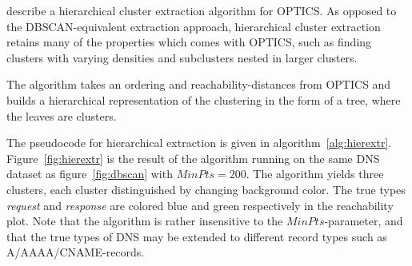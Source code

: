 \documentclass[a4paper]{report}
\begin{document}
\citet{sander03} describe a hierarchical cluster extraction algorithm for
OPTICS. As opposed to the DBSCAN-equivalent extraction approach, hierarchical
cluster extraction retains many of the properties which comes with OPTICS,
such as finding clusters with varying densities and subclusters nested in larger
clusters.

The algorithm takes an ordering and reachability-distances from OPTICS and
builds a hierarchical representation of the clustering in the form of a tree,
where the leaves are clusters.

The pseudocode for hierarchical extraction is given in
algorithm~\ref{alg:hierextr}. Figure~\ref{fig:hierextr} is the result of
the algorithm running on the same DNS dataset as figure~\ref{fig:dbscan}
with $MinPts = 200$. The algorithm yields three clusters, each cluster
distinguished by changing background color. The true types \emph{request} and
\emph{response} are colored blue and green respectively in the reachability
plot. Note that the algorithm is rather insensitive to the $MinPts$-parameter,
and that the true types of DNS may be extended to different record types such
as A/AAAA/CNAME-records.
\\
\end{document}
